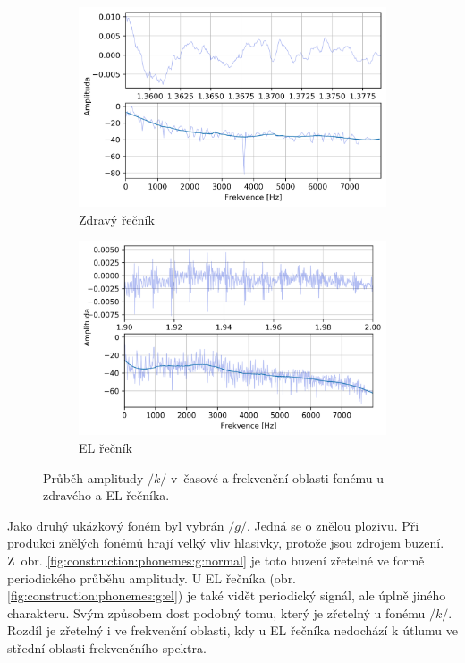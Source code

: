 \begin{figure}[htpb]
  \centering
  \begin{subfigure}[b]{0.45\textwidth}
    \includegraphics[width=\textwidth]{./ch5-construction/img/signal-normal_k.png}
    \caption{Zdravý řečník}
    \label{fig:construction:phonemes:k:normal}
  \end{subfigure}
  \begin{subfigure}[b]{0.45\textwidth}
    \includegraphics[width=\textwidth]{./ch5-construction/img/signal-el_k.png}
    \caption{EL řečník}
    \label{fig:construction:phonemes:k:el}
  \end{subfigure}
  \caption[Průběh amplitudy fonému $/k/$ zdravého a EL řečníka.]{Průběh amplitudy $/k/$ v~časové a frekvenční oblasti fonému u zdravého a EL řečníka.}
  \label{fig:construction:phonemes:k}
\end{figure}

Jako druhý ukázkový foném byl vybrán $/g/$.
Jedná se o znělou plozivu.
Při produkci znělých fonémů hrají velký vliv hlasivky, protože jsou zdrojem buzení.
Z~obr. \ref{fig:construction:phonemes:g:normal} je toto buzení zřetelné ve formě periodického průběhu amplitudy.
U EL řečníka (obr. \ref{fig:construction:phonemes:g:el}) je také vidět periodický signál, ale úplně jiného charakteru.
Svým způsobem dost podobný tomu, který je zřetelný u fonému $/k/$.
Rozdíl je zřetelný i ve frekvenční oblasti, kdy u EL řečníka nedochází k útlumu ve střední oblasti frekvenčního spektra.


